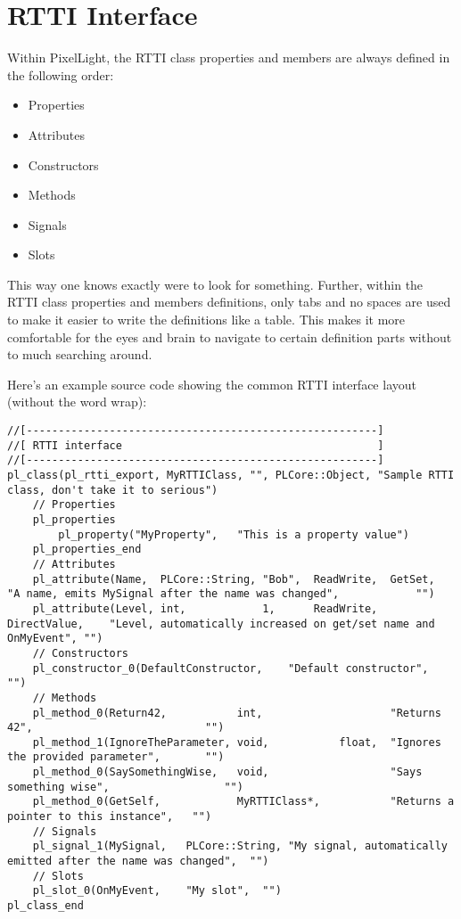 \section{RTTI Interface}
Within PixelLight, the RTTI class properties and members are always defined in the following order:
\begin{itemize}
\item Properties
\item Attributes
\item Constructors
\item Methods
\item Signals
\item Slots
\end{itemize}
This way one knows exactly were to look for something. Further, within the RTTI class properties and members definitions, only tabs and no spaces are used to make it easier to write the definitions like a table. This makes it more comfortable for the eyes and brain to navigate to certain definition parts without to much searching around.

Here's an example source code showing the common RTTI interface layout (without the word wrap):
\begin{lstlisting}[caption=RTTI interface (without the word wrap)]
//[-------------------------------------------------------]
//[ RTTI interface                                        ]
//[-------------------------------------------------------]
pl_class(pl_rtti_export, MyRTTIClass, "", PLCore::Object, "Sample RTTI class, don't take it to serious")
	// Properties
	pl_properties
		pl_property("MyProperty",	"This is a property value")
	pl_properties_end
	// Attributes
	pl_attribute(Name,	PLCore::String,	"Bob",	ReadWrite,	GetSet,			"A name, emits MySignal after the name was changed",			"")
	pl_attribute(Level,	int,			1,		ReadWrite,	DirectValue,	"Level, automatically increased on get/set name and OnMyEvent",	"")
	// Constructors
	pl_constructor_0(DefaultConstructor,	"Default constructor",	"")
	// Methods
	pl_method_0(Return42,			int,					"Returns 42",							"")
	pl_method_1(IgnoreTheParameter,	void,			float,	"Ignores the provided parameter",		"")
	pl_method_0(SaySomethingWise,	void,					"Says something wise",					"")
	pl_method_0(GetSelf,			MyRTTIClass*,			"Returns a pointer to this instance",	"")
	// Signals
	pl_signal_1(MySignal,	PLCore::String,	"My signal, automatically emitted after the name was changed",	"")
	// Slots
	pl_slot_0(OnMyEvent,	"My slot",	"")
pl_class_end
\end{lstlisting}




